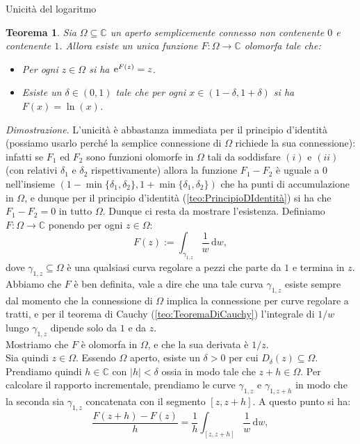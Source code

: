 \documentclass[11pt]{book}
\makeatletter
\theoremstyle{Definizione}
\theoremstyle{TeoremaProposizioneLemmaCorollarioCongettura}
\newtheorem{myteo}{Teorema}[section]
\theoremstyle{OsservazioneNotaEsempio}
\renewenvironment{proof}[1][\proofname]{\par
  \normalfont \topsep6\p@\@plus6\p@\relax
  \trivlist
  \item[\hskip\labelsep
        \itshape
    #1\@addpunct{.}]\ignorespaces
}{%
  \endtrivlist\@endpefalse
}
\renewenvironment{proof}{\textsl{Dimostrazione}.}{}
\newcommand{\C}{\mathbb{C}}
\newcommand{\Disc}[3][]{D^{#1}_{{#2}}({#3})}
\newcommand{\e}{\textup{e}}
\renewcommand{\d}{\mathrm{d}}
\newcommand{\dw}{\,\d w}
\makeatother
\begin{document}
\begin{boxteo}{Unicità del logaritmo}
\begin{myteo}\label{teo:TeoremaDiUnicitàDelLogaritmo}
Sia $\Omega \subseteq \C$ un aperto semplicemente connesso non contenente $0$ e contenente $1$. Allora esiste un unica funzione $F:\Omega\longrightarrow \C$ olomorfa tale che:
\begin{itemize}
\item[$(i)$] Per ogni $z\in \Omega$ si ha $\e^{F(z)} = z$.
\item[$(ii)$] Esiste un $\delta \in (0,1)$ tale che per ogni $x\in (1-\delta,1+\delta)$ si ha $F(x) = \ln(x)$.
\end{itemize}
\end{myteo}
\tcblower
\begin{proof}
L'unicità è abbastanza immediata per il principio d'identità (possiamo usarlo perché la semplice connessione di $\Omega$ richiede la sua connessione): infatti se $F_1$ ed $F_2$ sono funzioni olomorfe in $\Omega$ tali da soddisfare $(i)$ e $(ii)$ (con relativi $\delta_1$ e $\delta_2$ rispettivamente) allora la funzione $F_1-F_2$ è uguale a $0$ nell'insieme $(1-\min\{\delta_1,\delta_2\},1+\min\{\delta_1,\delta_2\})$ che ha punti di accumulazione in $\Omega$, e dunque per il principio d'identità (\ref{teo:PrincipioDIdentità}) si ha che $F_1-F_2 =0$ in tutto $\Omega$. Dunque ci resta da mostrare l'esistenza.
Definiamo $F: \Omega \longrightarrow \C$ ponendo per ogni $z\in \Omega$:
$$
F(z) := \int_{\gamma_{1,z}} \frac{1}{w}\dw,
$$
dove $\gamma_{1,z}\subseteq \Omega$ è una qualsiasi curva regolare a pezzi che parte da $1$ e termina in $z$.\\
Abbiamo che $F$ è ben definita, vale a dire che una tale curva $\gamma_{1,z}$ esiste sempre dal momento che la connessione di $\Omega$ implica la connessione per curve regolare a tratti, e per il teorema di Cauchy (\ref{teo:TeoremaDiCauchy}) l'integrale di $1/w$ lungo $\gamma_{1,z}$ dipende solo da $1$ e da $z$.\\
Mostriamo che $F$ è olomorfa in $\Omega$, e che la sua derivata è $1/z$.\\
Sia quindi $z\in \Omega$. Essendo $\Omega$ aperto, esiste un $\delta > 0$ per cui $\Disc{\delta}{z}\subseteq \Omega$. Prendiamo quindi $h\in \C$ con $|h| < \delta$ ossia in modo tale che $z+h\in \Omega$. Per calcolare il rapporto incrementale, prendiamo le curve $\gamma_{1,z}$ e $\gamma_{1,z+h}$ in modo che la seconda sia $\gamma_{1,z}$ concatenata con il segmento $[z,z+h]$. A questo punto si ha:
$$
\frac{F(z+h)-F(z)}{h} = \frac{1}{h}\int_{[z,z+h]} \frac{1}{w}\dw,
$$
\end{proof}
\end{boxteo}
\end{document}
